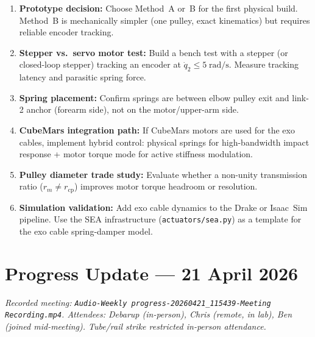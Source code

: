 \documentclass[11pt, a4paper]{article}
\begin{document}
\begin{enumerate}
  \item \textbf{Prototype decision:} Choose Method~A or~B for the first
    physical build.  Method~B is mechanically simpler (one pulley, exact
    kinematics) but requires reliable encoder tracking.

  \item \textbf{Stepper vs.\ servo motor test:} Build a bench test with a
    stepper (or closed-loop stepper) tracking an encoder at
    $\dot{q}_2 \leq 5\;\text{rad/s}$.  Measure tracking latency and
    parasitic spring force.

  \item \textbf{Spring placement:} Confirm springs are between elbow pulley
    exit and link-2 anchor (forearm side), not on the motor/upper-arm side.

  \item \textbf{CubeMars integration path:} If CubeMars motors are used for
    the exo cables, implement hybrid control: physical springs for
    high-bandwidth impact response + motor torque mode for active stiffness
    modulation.

  \item \textbf{Pulley diameter trade study:} Evaluate whether a non-unity
    transmission ratio ($r_m \neq r_{\text{cp}}$) improves motor torque
    headroom or resolution.

  \item \textbf{Simulation validation:} Add exo cable dynamics to the
    Drake or Isaac~Sim pipeline.  Use the SEA infrastructure
    (\texttt{actuators/sea.py}) as a template for the exo cable
    spring-damper model.
\end{enumerate}


\section{Progress Update --- 21 April 2026}
\label{sec:progress-apr21}

\noindent
\textit{Recorded meeting: \texttt{Audio-Weekly progress-20260421\_115439-Meeting Recording.mp4}.
Attendees: Debarup (in-person), Chris (remote, in lab), Ben (joined mid-meeting).
Tube/rail strike restricted in-person attendance.}

\end{document}
